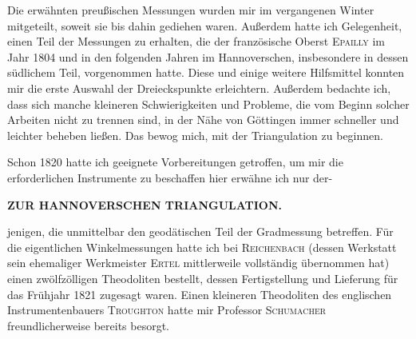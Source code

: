 \par\noindent\hspace*{\parindent}Die erwähnten preußischen Messungen wurden mir im vergangenen Winter
mitgeteilt, soweit sie bis dahin gediehen waren. Außerdem hatte ich Gelegenheit,
einen Teil der Messungen zu erhalten, die der französische Oberst \textsc{Epailly}
im Jahr 1804 und in den folgenden Jahren im Hannoverschen, insbesondere in
dessen südlichem Teil, vorgenommen hatte. Diese und einige weitere Hilfsmittel
konnten mir die erste Auswahl der Dreieckspunkte erleichtern. Außerdem
bedachte ich, dass sich manche kleineren Schwierigkeiten und Probleme, die
vom Beginn solcher Arbeiten nicht zu trennen sind, in der Nähe von Göttingen
immer schneller und leichter beheben ließen. Das bewog mich, mit der
Triangulation  zu beginnen.

\par\noindent\hspace*{\parindent}Schon 1820 hatte ich geeignete Vorbereitungen getroffen, um mir die
erforderlichen Instrumente zu beschaffen\textperiodcentered{} hier erwähne ich nur der-
\par\clearpage

\noindent\null\hfill{\small\textbf{ZUR HANNOVERSCHEN TRIANGULATION.}}\hfill{}\par\medskip
\noindent jenigen, die unmittelbar den geodätischen Teil der Gradmessung betreffen.
Für die eigentlichen Winkelmessungen hatte ich bei \textsc{Reichenbach} (dessen
Werkstatt sein ehemaliger Werkmeister \textsc{Ertel} mittlerweile vollständig
übernommen hat) einen zwölfzölligen Theodoliten bestellt, dessen Fertigstellung
und Lieferung für das Frühjahr 1821 zugesagt waren. Einen kleineren
Theodoliten des englischen Instrumentenbauers \textsc{Troughton} hatte mir Professor
\textsc{Schumacher} freundlicherweise bereits besorgt.

